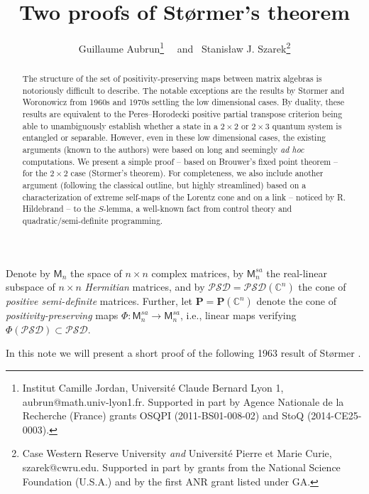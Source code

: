 \documentclass[10pt]{article}
\title{Two proofs of St{\o}rmer's theorem}
\author{Guillaume Aubrun\footnote{Institut
Camille Jordan, Universit\'{e} Claude Bernard Lyon 1, {aubrun@math.univ-lyon1.fr}. Supported in part by Agence Nationale de la Recherche (France) 
grants OSQPI (2011-BS01-008-02) and StoQ (2014-CE25-0003).} \ \ and \ Stanis{\l}aw J. Szarek\footnote{Case Western Reserve University {\sl and} Universit\'{e}  Pierre et Marie Curie, szarek@cwru.edu. Supported in part by grants from the National Science
Foundation (U.S.A.) and by the first ANR grant listed under GA.}}
\date{}
\newcommand{\PSD}{\mathcal{PSD}}
\newcommand{\cP}{\bm{P}}
\newcommand{\C}{\mathbb{C}}
\newcommand{\cM}{\mathsf{M}}
\theoremstyle{plain}
\theoremstyle{definition}
\theoremstyle{remark}
\begin{document}
\maketitle

\begin{abstract}
The structure of the set of positivity-preserving maps between matrix algebras is notoriously difficult to describe. The notable exceptions are the results by St{\o}rmer and Woronowicz from 1960s and 1970s settling the low dimensional cases. By duality, these results are equivalent to the Peres--Horodecki positive partial transpose criterion being able to unambiguously establish whether a state in a $2 \times 2$ or $2 \times 3$ quantum system is entangled or separable.  
However, even in these low dimensional cases, the existing arguments (known to the authors) were based on long and seemingly {\sl ad hoc} computations. We present a simple proof -- based on Brouwer's fixed point theorem -- 
for the  $2 \times 2$ case (St{\o}rmer's theorem). 
For completeness, we also include another argument 
(following the classical outline, but highly streamlined)  
based on a characterization of extreme self-maps of the Lorentz cone and on a link -- 
noticed by R. Hildebrand -- to  the $S$-lemma, 
a well-known fact from control theory and quadratic/semi-definite programming.  
\end{abstract}


\bigskip 
Denote by $\cM_n$ the space of  $n \times n$ complex matrices, 
by $\cM_n^{sa}$ the real-linear subspace of $n \times n$ {\em Hermitian} matrices, 
and by $\PSD = \PSD(\C^n)$ the cone of  {\em positive semi-definite} matrices. 
Further, let $\cP = \cP(\C^n)$ denote the cone of {\em positivity-preserving} maps  $\Phi : \cM_n^{sa} \to \cM_n^{sa}$,  
 i.e., linear maps verifying $\Phi(\PSD) \subset \PSD$. 
 
\smallskip 
In this note we will present a short proof of the following 1963 result of St{\o}rmer \cite{Stormer63}.
 
\end{document}
